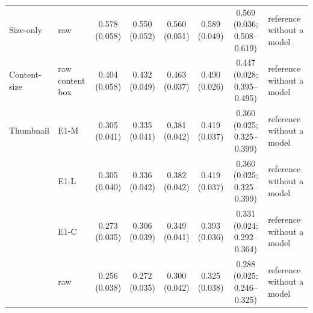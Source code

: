 \begin{longtable}{@{}p{3.6cm}lcccccp{2.6cm}@{}}
\addlinespace[2pt]
Size-only & raw & \makecell{0.578\\{\scriptsize (0.058)}} & \makecell{0.550\\{\scriptsize (0.052)}} & \makecell{0.560\\{\scriptsize (0.051)}} & \makecell{0.589\\{\scriptsize (0.049)}} & \makecell{0.569\\{\scriptsize (0.036; 0.508--0.619)}} & reference without a model \\
\addlinespace[2pt]
Content-size & raw content box & \makecell{0.404\\{\scriptsize (0.058)}} & \makecell{0.432\\{\scriptsize (0.049)}} & \makecell{0.463\\{\scriptsize (0.037)}} & \makecell{0.490\\{\scriptsize (0.026)}} & \makecell{0.447\\{\scriptsize (0.028; 0.395--0.495)}} & reference without a model \\
\addlinespace[2pt]
Thumbnail & E1-M & \makecell{0.305\\{\scriptsize (0.041)}} & \makecell{0.335\\{\scriptsize (0.041)}} & \makecell{0.381\\{\scriptsize (0.042)}} & \makecell{0.419\\{\scriptsize (0.037)}} & \makecell{0.360\\{\scriptsize (0.025; 0.325--0.399)}} & reference without a model \\
 & E1-L & \makecell{0.305\\{\scriptsize (0.040)}} & \makecell{0.336\\{\scriptsize (0.042)}} & \makecell{0.382\\{\scriptsize (0.042)}} & \makecell{0.419\\{\scriptsize (0.037)}} & \makecell{0.360\\{\scriptsize (0.025; 0.325--0.399)}} & reference without a model \\
 & E1-C & \makecell{0.273\\{\scriptsize (0.035)}} & \makecell{0.306\\{\scriptsize (0.039)}} & \makecell{0.349\\{\scriptsize (0.041)}} & \makecell{0.393\\{\scriptsize (0.036)}} & \makecell{0.331\\{\scriptsize (0.024; 0.292--0.364)}} & reference without a model \\
 & raw & \makecell{0.256\\{\scriptsize (0.038)}} & \makecell{0.272\\{\scriptsize (0.035)}} & \makecell{0.300\\{\scriptsize (0.042)}} & \makecell{0.325\\{\scriptsize (0.038)}} & \makecell{0.288\\{\scriptsize (0.025; 0.246--0.325)}} & reference without a model \\
\end{longtable}
